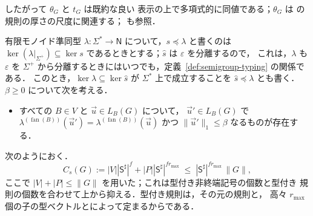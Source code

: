 \documentclass[11pt,a4paper]{ltjsarticle}
\numberwithin{equation}{section}
\theoremstyle{plain}
\theoremstyle{definition}
\theoremstyle{remark}
\newcommand{\tuple}[1]{\vec{#1}}
\newcommand{\eps}{\varepsilon}
\newcommand{\fan}{\operatorname{fan}}
\theoremstyle{plain}
\begin{document}
したがって $\theta_G$ と $t_G$ は既約な良い
表示の上で多項式的に同値である；$\theta_G$ は
\cite[Definition~1]{Yoshinaka2011} の規則の厚さの尺度に関連する；
\cite{EyraudHeinzYoshinaka2016} も参照．

有限モノイド準同型 $\lambda:\Sigma^*\to\mathsf N$ について，$s\preceq\lambda$ と書くのは
$\ker(\lambda|_{\Sigma^+})\subseteq\ker s$ であるときとする；$\widehat s$ は $\eps$ を分離するので，
これは，$\lambda$ も
$\eps$ を $\Sigma^+$ から分離するときにはいつでも，定義~\ref{def:semigroup-typing} の関係である．
このとき，$\ker\lambda\subseteq\ker\widehat s$ が $\Sigma^*$ 上で成立することを
$\widehat s\preceq\lambda$ とも書く．
$\beta\ge0$ について次を考える．
\begin{itemize}[leftmargin=4em]
\item[$(\mathrm R_\beta^\lambda)$] すべての $B\in V$ と $\tuple u\in L_B(G)$ について，
$\tuple u'\in L_B(G)$ で
$\lambda^{(\fan(B))}(\tuple u')=\lambda^{(\fan(B))}(\tuple u)$ かつ
$\|\tuple u'\|_1\le\beta$ なるものが存在する．
\end{itemize}
次のようにおく．
\[
 C_s(G):=|V||\mathsf S^\sharp|^f+|P||\mathsf S^\sharp|^{fr_{\max}}
 \;\le\;|\mathsf S^\sharp|^{fr_{\max}}\,\|G\|,
\]
ここで $|V|+|P|\le\|G\|$ を用いた；これは型付き非終端記号の個数と型付き
規則の個数を合わせて上から抑える．型付き規則は，その元の規則と，
高々 $r_{\max}$ 個の子の型ベクトルとによって定まるからである．
\end{document}
